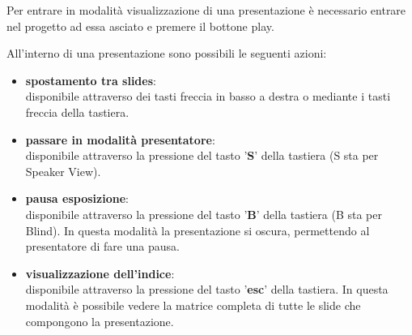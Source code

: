\noindent
Per entrare in modalità visualizzazione di una presentazione è necessario entrare nel progetto ad essa asciato e premere il bottone play. 

All'interno di una presentazione sono possibili le seguenti azioni:

\begin{itemize}
 \item \textbf{spostamento tra slides}: \\disponibile attraverso dei tasti freccia in basso a destra o mediante i tasti freccia della tastiera.
 \item \textbf{passare in modalità presentatore}: \\disponibile attraverso la pressione del tasto '\textbf{S}' della tastiera (S sta per Speaker View).
  \item \textbf{pausa esposizione}: \\disponibile attraverso la pressione del tasto '\textbf{B}' della tastiera (B sta per Blind). In questa modalità la presentazione si oscura, permettendo al presentatore di fare una pausa.
  \item \textbf{visualizzazione dell'indice}: \\disponibile attraverso la pressione del tasto '\textbf{esc}' della tastiera. In questa modalità è possibile vedere la matrice completa di tutte le \gls{slide} che compongono la presentazione.

  \end{itemize}

